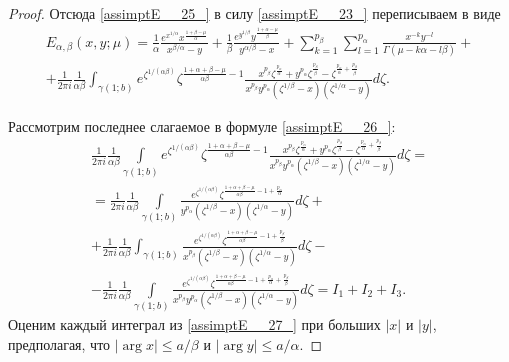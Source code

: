 {\begin{proof}
Отсюда \eqref{assimptE__25_} в силу \eqref{assimptE__23_} переписываем в виде
\begin{multline}
\label{assimptE__26_}
E_{\alpha, \beta }  (x, y; \mu)=\frac{1}{\alpha } \frac{e^{x^{1/ \alpha}  } x^{\frac{1+\beta -\mu }{\alpha } } }{x^{\beta /\alpha} -y} +\frac{1}{\beta } \frac{e^{y^{1/\beta} } y^{\frac{1+\alpha -\mu }{\beta } } }{y^{\alpha/\beta}  -x} +\sum _{k=1}^{p_{\beta } }\sum _{l=1}^{p_{\alpha } }\frac{x^{-k} y^{-l} }{\Gamma (\mu -k\alpha -l\beta)} +
\\
+\frac{1}{2\pi i} \frac{1}{\alpha \beta } \int _{\gamma (1; b)}e^{\zeta ^{1/(\alpha \beta)} }   \zeta ^{\frac{1+\alpha +\beta -\mu }{\alpha \beta } -1} \frac{x^{p_{\beta } } \zeta ^{\frac{p_{\alpha } }{\alpha } } +y^{p_{\alpha } } \zeta ^{\frac{p_{\beta } }{\beta } } -\zeta ^{\frac{p_{\alpha } }{\alpha } +\frac{p_{\beta } }{\beta } } }{x^{p_{\beta } } y^{p_{\alpha } } \left(\zeta ^{1/\beta} -x\right)\left(\zeta ^{1/ \alpha}  -y\right)} d \zeta.
\end{multline}

Рассмотрим последнее слагаемое в формуле \eqref{assimptE__26_}:
\begin{multline}
\label{assimptE__27_}
\frac{1}{2\pi i} \frac{1}{\alpha \beta } \int\limits_{\gamma (1; b)}e^{\zeta ^{1/(\alpha \beta)} }   \zeta ^{\frac{1+\alpha +\beta -\mu }{\alpha \beta } -1} \frac{x^{p_{\beta } } \zeta ^{\frac{p_{\alpha } }{\alpha } } +y^{p_{\alpha } } \zeta ^{\frac{p_{\beta } }{\beta } } -\zeta ^{\frac{p_{\alpha } }{\alpha } +\frac{p_{\beta } }{\beta } } }{x^{p_{\beta } } y^{p_{\alpha } } \left(\zeta ^{1/\beta} -x\right)\left(\zeta ^{1/ \alpha}  -y\right)} d \zeta =
\\
=\frac{1}{2\pi i} \frac{1}{\alpha \beta } \int\limits_{\gamma (1; b)}\frac{e^{\zeta ^{1/(\alpha \beta)} }   \zeta ^{\frac{1+\alpha +\beta -\mu }{\alpha \beta } -1+\frac{p_{\alpha } }{\alpha } } }{y^{p_{\alpha } } \left(\zeta ^{1/\beta} -x\right)\left(\zeta ^{1/ \alpha}  -y\right)} d\zeta +
\\
+\frac{1}{2\pi i} \frac{1}{\alpha \beta } \int _{\gamma (1; b)}\frac{e^{\zeta ^{1/(\alpha \beta)} }   \zeta ^{\frac{1+\alpha +\beta -\mu }{\alpha \beta } -1+\frac{p_{\beta } }{\beta } } }{x^{p_{\beta } } \left(\zeta ^{1/\beta} -x\right)\left(\zeta ^{1/ \alpha}  -y\right)} d\zeta  -
\\
-\frac{1}{2\pi i} \frac{1}{\alpha \beta } \int\limits_{\gamma (1; b)}\frac{e^{\zeta ^{1/(\alpha \beta)} }   \zeta ^{\frac{1+\alpha +\beta -\mu }{\alpha \beta } -1+\frac{p_{\alpha } }{\alpha } +\frac{p_{\beta } }{\beta } } }{x^{p_{\beta } } y^{p_{\alpha } } \left(\zeta ^{1/\beta} -x\right)\left(\zeta ^{1/ \alpha}  -y\right)} d \zeta =I_{1} +I_{2} +I_{3} .
\end{multline}
Оценим каждый интеграл из \eqref{assimptE__27_} при больших $|x|$ и $|y|$,
предполагая, что $|\arg x|\le a/\beta $ и
$\left|\arg y\right|\le a/\alpha $.


\end{proof}}
